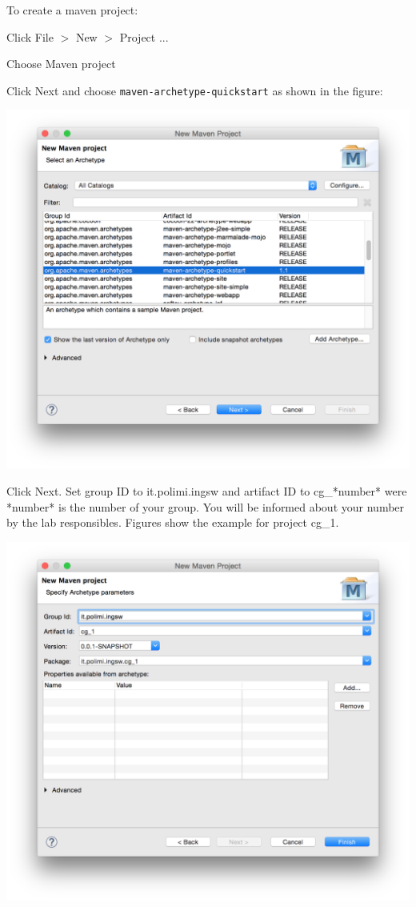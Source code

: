 \documentclass{article}
\begin{document}
To create a maven project:
\begin{compactitem}
\item Click File $>$ New $>$ Project ...
\item Choose Maven project
\item Click Next and choose \texttt{maven-archetype-quickstart} as
  shown in the figure:
\begin{center}
\includegraphics[scale=0.5]{figures/2}
\end{center}
\item Click Next. Set group ID to it.polimi.ingsw and artifact ID
  to cg\_*number* were *number* is the number of your group. You will
  be informed about your number by the lab responsibles. Figures show
  the example for project cg\_1.
\begin{center}
\includegraphics[scale=0.5]{figures/3}

\end{center}
\end{compactitem}
\end{document}
